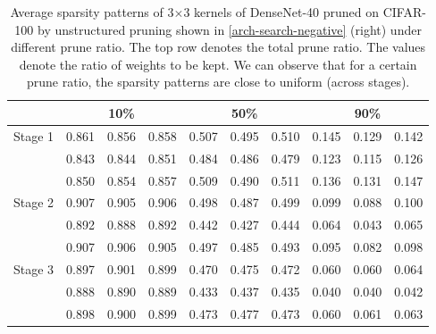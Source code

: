 \setlength{\tabcolsep}{5pt}
\renewcommand{\arraystretch}{1.2}
\begin{table}[!htbp]
\centering
\small
\begin{tabular}{c|ccc|ccc|ccl}
\hline
                         & \multicolumn{3}{c|}{10\%} & \multicolumn{3}{c|}{50\%} & \multicolumn{3}{c}{90\%} \\ \hline
\multirow{3}{*}{Stage 1} & 0.861   & 0.856  & 0.858  & 0.507   & 0.495  & 0.510  & 0.145  & 0.129  & 0.142  \\
                         & 0.843   & 0.844  & 0.851  & 0.484   & 0.486  & 0.479  & 0.123  & 0.115  & 0.126  \\
                         & 0.850   & 0.854  & 0.857  & 0.509   & 0.490  & 0.511  & 0.136  & 0.131  & 0.147  \\ \hline
\multirow{3}{*}{Stage 2} & 0.907   & 0.905  & 0.906  & 0.498   & 0.487  & 0.499  & 0.099  & 0.088  & 0.100  \\
                         & 0.892   & 0.888  & 0.892  & 0.442   & 0.427  & 0.444  & 0.064  & 0.043  & 0.065  \\
                         & 0.907   & 0.906  & 0.905  & 0.497   & 0.485  & 0.493  & 0.095  & 0.082  & 0.098  \\ \hline
\multirow{3}{*}{Stage 3} & 0.897   & 0.901  & 0.899  & 0.470   & 0.475  & 0.472  & 0.060  & 0.060  & 0.064  \\
                         & 0.888   & 0.890  & 0.889  & 0.433   & 0.437  & 0.435  & 0.040  & 0.040  & 0.042  \\
                         & 0.898   & 0.900  & 0.899  & 0.473   & 0.477  & 0.473  & 0.060  & 0.061  & 0.063  \\ \hline
\end{tabular}
  \caption{
      Average sparsity patterns of 3$\times$3 kernels of DenseNet-40 pruned on CIFAR-100 by unstructured pruning shown in \autoref{arch-search-negative} (right) under different prune ratio. The top row denotes the total prune ratio. The values denote the ratio of weights to be kept. We can observe that for a certain prune ratio, the sparsity patterns are close to uniform (across stages).}
\label{sparsity-8}
\end{table}

\clearpage

